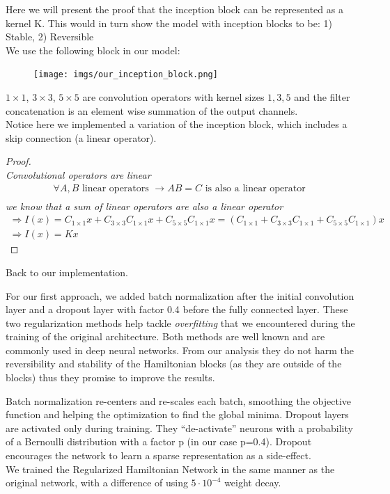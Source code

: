 \documentclass{article}
\theoremstyle{remark}
\begin{document}
Here we will present the proof that the inception block can be represented as a kernel K. This would in turn show the model with inception blocks to be: 1) Stable, 2) Reversible \\
We use the following block in our model: \\
\begin{figure}[H]
    \centering
    \texttt{[image: imgs/our\_inception\_block.png]}
\end{figure}
$1 \times 1$, $3 \times 3$, $5 \times 5$ are convolution operators with kernel sizes $1, 3, 5$ and the filter concatenation is an element wise summation of the output channels.\\
Notice here we implemented a variation of the inception block, which includes a skip connection (a linear operator).\\
\begin{proof}\ \\
\textit{Convolutional operators are linear}\cite{Signals and Systems}\\
\begin{gather*}
    \forall A,B \text{ linear operators } \rightarrow AB = C \text{ is also a linear operator }\\
\end{gather*}
\textit{we know that a sum of linear operators are also a linear operator}\\
\begin{gather*}
    \Rightarrow I(x) = C_{1 \times 1} x + C_{3 \times 3} C_{1 \times 1} x + C_{5 \times 5} C_{1 \times 1} x = (C_{1 \times 1} + C_{3 \times 3} C_{1 \times 1} + C_{5 \times 5} C_{1 \times 1}) x \\
    \Rightarrow I(x) = Kx
\end{gather*}
\end{proof} \par
Back to our implementation. \par
For our first approach, we added batch normalization after the initial convolution layer and a dropout layer with factor 0.4 before the fully connected layer. These two regularization 
methods help tackle \textit{overfitting} that we encountered during the training of the original architecture. Both methods are well known and are commonly used in deep neural networks. 
From our analysis they do not harm the reversibility and stability of the Hamiltonian blocks (as they are outside of the blocks) thus they promise to improve the results. \par
Batch normalization re-centers and re-scales each batch, smoothing the objective function and helping the optimization to find the global minima. Dropout layers are activated only during 
training. They “de-activate” neurons with a probability of a Bernoulli distribution with a factor p (in our case p=0.4). Dropout encourages the network to learn a sparse representation as 
a side-effect.\\
We trained the Regularized Hamiltonian Network in the same manner as the original network, with a difference of using $5\cdot 10^{-4}$ weight decay. \par
\end{document}
